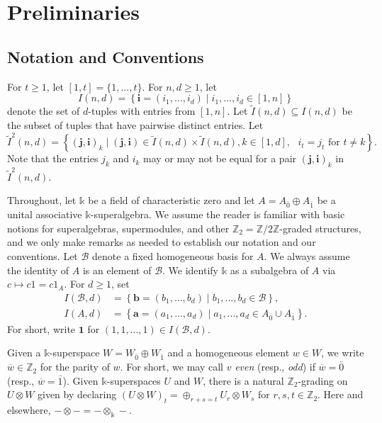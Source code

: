 \documentclass[11pt,reqno]{amsart} %
\newcommand{\Z}{\mathbb{Z}}
\renewcommand{\k}{\mathds{k}}
\newcommand{\0}{\bar{0}}
\newcommand{\1}{\bar{1}}
\newcommand{\BasisB}{\mathcal{B}}
\newcommand{\parity}[1]{\overline{#1}}
\newcommand{\bi}{\mathbf{i}}
\newcommand{\bj}{\mathbf{j}}
\newcommand{\ba}{\mathbf{a}}
\newcommand{\bb}{\mathbf{b}}
\newcommand{\bone}{\mathbf{1}}
\newcommand{\Itwo}{\tilde{I}^{2}(n,d)}
\newcommand{\tI}{\tilde{I}}
\numberwithin{equation}{subsection}
\begin{document}
\section{Preliminaries} 

\subsection{Notation and Conventions} For $t \geq 1$, let $[1,t] = \{1, \dotsc ,t \}$. For $n, d \geq 1$, let 
\[
I(n,d) = \left\{\bi = (i_{1}, \dotsc , i_{d}) \mid i_{1}, \dotsc , i_{d} \in [1,n] \right\}
\] denote the set of $d$-tuples with entries from $[1,n]$.
 Let $\tI(n,d) \subseteq I(n,d)$ be the subset of tuples that have pairwise distinct entries.      Let
\[
 \Itwo = \left\{(\bj, \bi)_{k}  \mid (\bj, \bi) \in \tI(n,d) \times \tI(n,d), k\in [1,d], \text{ $i_{t}=j_{t}$ for $t \neq k$} \right\}.
\]  Note that the entries $j_{k}$ and $i_{k}$ may or may not be equal for a pair $(\bj,\bi)_{k}$ in $\Itwo$.


Throughout, let $\k$ be a field of characteristic zero and let $A = A_{\0} \oplus A_{\1}$ be a unital associative $\k$-superalgebra.  We assume the reader is familiar with basic notions for superalgebras, supermodules, and other $\Z_{2}=\Z /2\Z$-graded structures, and we only make remarks as needed to establish our notation and our conventions.  Let $\BasisB$ denote a fixed homogeneous basis for $A$.  We always assume the identity of $A$ is an element of $\BasisB$.  We identify $\k$ as a subalgebra of $A$ via $c \mapsto c1=c1_{A}$.  For $d \geq 1$, set 
\begin{align*}
I(\BasisB,d) &= \left\{\bb = (b_{1}, \dotsc , b_{d}) \mid b_{1}, \dotsc , b_{d} \in \BasisB  \right\}, \\
I(A,d) &= \left\{\ba = (a_{1}, \dotsc , a_{d}) \mid a_{1}, \dotsc , a_{d} \in A_{\0} \cup A_{\1} \right\}.
\end{align*}  For short, write $\bone$ for $(1,1,\dotsc ,1) \in I(\BasisB,d)$.



Given a $\k$-superspace $W =  W_{\0}\oplus W_{\1}$  and a homogeneous element $w \in W$, we write $\parity{w} \in \Z_{2}$ for the parity of $w$.  For short, we may call $v$ \emph{even} (resp., \emph{odd}) if $\parity{w}=\0$ (resp., $\parity{w}=\1$). Given $\k$-superspaces $U$ and $W$, there is a natural $\Z_{2}$-grading on $U\otimes W$ given by declaring $(U\otimes W)_{t} = \oplus_{r+s = t} U_{r}\otimes W_{s}$ for $r,s,t \in \Z_{2}$.  Here and elsewhere, $-\otimes-=-\otimes_{\k}-$.
\end{document}
